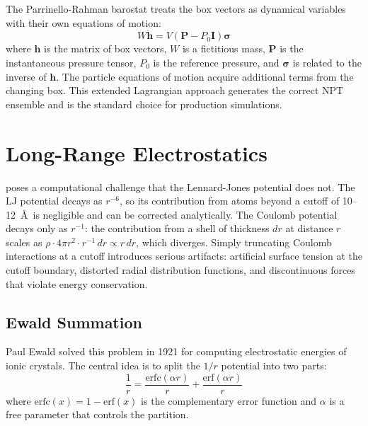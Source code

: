 The Parrinello-Rahman barostat treats the box vectors as dynamical variables with their own equations of motion:
\begin{equation}
\label{eq:pr-box}
W\ddot{\mathbf{h}} = V(\mathbf{P} - P_0\mathbf{I})\boldsymbol{\sigma}
\end{equation}
where $\mathbf{h}$ is the matrix of box vectors, $W$ is a fictitious mass, $\mathbf{P}$ is the instantaneous pressure tensor, $P_0$ is the reference pressure, and $\boldsymbol{\sigma}$ is related to the inverse of $\mathbf{h}$. The particle equations of motion acquire additional terms from the changing box. This extended Lagrangian approach generates the correct NPT ensemble and is the standard choice for production simulations.

\section{Long-Range Electrostatics}
\label{sec:long-range}

 poses a computational challenge that the Lennard-Jones potential does not. The LJ potential decays as $r^{-6}$, so its contribution from atoms beyond a cutoff of 10--12~\AA\ is negligible and can be corrected analytically. The Coulomb potential decays only as $r^{-1}$: the contribution from a shell of thickness $dr$ at distance $r$ scales as $\rho \cdot 4\pi r^2 \cdot r^{-1} \, dr \propto r\,dr$, which diverges. Simply truncating Coulomb interactions at a cutoff introduces serious artifacts: artificial surface tension at the cutoff boundary, distorted radial distribution functions, and discontinuous forces that violate energy conservation.

\subsection{Ewald Summation}
\label{sec:ewald}

Paul Ewald solved this problem in 1921 for computing electrostatic energies of ionic crystals. The central idea is to split the $1/r$ potential into two parts:
\begin{equation}
\label{eq:ewald-split}
\frac{1}{r} = \frac{\text{erfc}(\alpha r)}{r} + \frac{\text{erf}(\alpha r)}{r}
\end{equation}
where $\text{erfc}(x) = 1 - \text{erf}(x)$ is the complementary error function and $\alpha$ is a free parameter that controls the partition.

